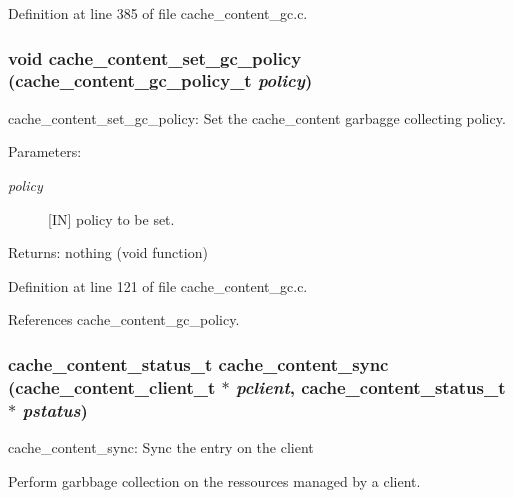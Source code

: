 Definition at line 385 of file cache\_\-content\_\-gc.c.
\subsubsection{\setlength{\rightskip}{0pt plus 5cm}void cache\_\-content\_\-set\_\-gc\_\-policy (cache\_\-content\_\-gc\_\-policy\_\-t {\em policy})}\label{cache__content__gc_8c_a1}


cache\_\-content\_\-set\_\-gc\_\-policy: Set the cache\_\-content garbagge collecting policy.

\begin{Desc}
\item[Parameters:]
\begin{description}
\item[{\em policy}][IN] policy to be set.\end{description}
\end{Desc}
\begin{Desc}
\item[Returns:]nothing (void function) \end{Desc}


Definition at line 121 of file cache\_\-content\_\-gc.c.

References cache\_\-content\_\-gc\_\-policy.
\subsubsection{\setlength{\rightskip}{0pt plus 5cm}cache\_\-content\_\-status\_\-t cache\_\-content\_\-sync (cache\_\-content\_\-client\_\-t $\ast$ {\em pclient}, cache\_\-content\_\-status\_\-t $\ast$ {\em pstatus})}\label{cache__content__gc_8c_a8}


cache\_\-content\_\-sync: Sync the entry on the client

Perform garbbage collection on the ressources managed by a client.

